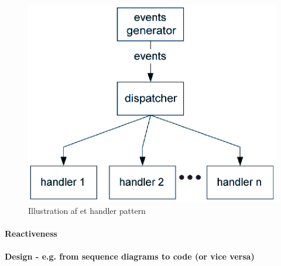 \begin{figure}[h]
	\centering
	\includegraphics[width=0.6\linewidth]{figs/spm3/handlersPattern}
	\caption{Illustration af et handler pattern}
	\label{fig:handlPat}
\end{figure}

\paragraph{Reactiveness}

\paragraph{Design - e.g. from sequence diagrams to code (or vice versa)}
